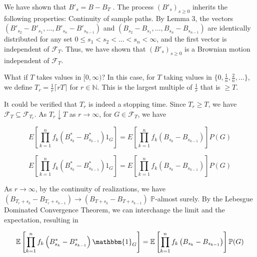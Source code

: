 \documentclass[12pt]{article}
\begin{document}
We have shown that $ B'_s = B - B_T $ . The process $ (B'_s)_{s \geq 0} $ inherits the following properties:
Continuity of sample paths. By Lemma 3, the vectors $(B'_{s_2} - B'_{s_1}, \ldots, B'_{s_n} - B'_{s_{n-1}})$ and $(B_{s_2} - B_{s_1}, \ldots, B_{s_n} - B_{s_{n-1}})$ are identically distributed for any set $0 \leq s_1 < s_2 < \ldots < s_n < \infty$, and the first vector is independent of $\mathcal{F}_T$.
Thus, we have shown that $(B'_s)_{s \geq 0}$ is a Brownian motion independent of $\mathcal{F}_T$.

What if $T$ takes values in $[0, \infty)$? In this case, for $T$ taking values in $\{0, \tfrac{1}{n}, \tfrac{2}{n}, \ldots \}$, we define $T_r = \tfrac{1}{r}\lceil rT\rceil$ for $r\in\mathbb{N}$. This is the largest multiple of $\tfrac{1}{r}$ that is $\geq T$.

It could be verified that $T_r$ is indeed a stopping time. Since $T_r \geq T$, we have $\mathcal{F}_{T} \subseteq \mathcal{F}_{T_r}$. As $T_r \downarrow T$ as $r \rightarrow \infty$, for $G \in \mathcal{F}_T$, we have

$$
E\left[\prod_{k=1}^nf_k\left(B^*_{s_k} - B^*_{s_{k-1}}\right)1_G\right] = E\left[\prod_{k=1}^nf_k\left(B_{s_k} - B_{s_{k-1}}\right)\right]P(G)
$$

$$
E\left[\prod_{k=1}^nf_k\left(B^*_{s_k} - B^*_{s_{k-1}}\right)1_G\right] = E\left[\prod_{k=1}^nf_k\left(B_{s_k} - B_{s_{k-1}}\right)\right]P(G)
$$


As $r \rightarrow \infty$, by the continuity of realizations, we have $(B_{T_r + s_k} - B_{T_r + s_{k-1}}) \rightarrow (B_{T + s_k} - B_{T + s_{k-1}})$ $\mathbb{P}$-almost surely. By the Lebesgue Dominated Convergence Theorem, we can interchange the limit and the expectation, resulting in

$$
        \mathbb{E}\left[\prod_{k=1}^nf_k\left(B^*_{s_k} - B^*_{s_{k-1}}\right)\mathbbm{1}_G\right] = \mathbb{E}\left[\prod_{k=1}^nf_k\left(B_{s_k} - B_{s_{k-1}}\right)\right]\mathbb{P}(G)
$$
\end{document}
